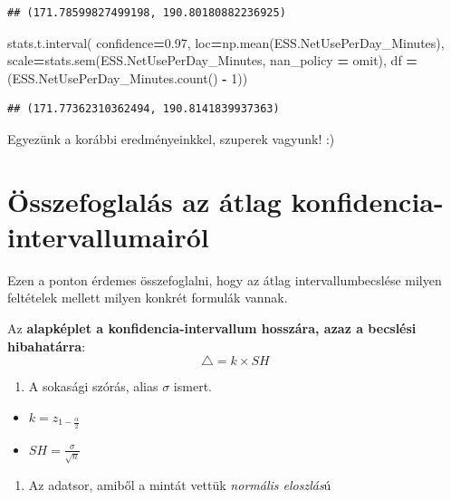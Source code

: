 \documentclass[
]{book}
\newenvironment{Shaded}{\begin{snugshade}}{\end{snugshade}}
\newcommand{\DecValTok}[1]{\textcolor[rgb]{0.00,0.00,0.81}{#1}}
\newcommand{\FloatTok}[1]{\textcolor[rgb]{0.00,0.00,0.81}{#1}}
\newcommand{\NormalTok}[1]{#1}
\newcommand{\OperatorTok}[1]{\textcolor[rgb]{0.81,0.36,0.00}{\textbf{#1}}}
\newcommand{\StringTok}[1]{\textcolor[rgb]{0.31,0.60,0.02}{#1}}
\providecommand{\tightlist}{%
  \setlength{\itemsep}{0pt}\setlength{\parskip}{0pt}}
\begin{document}
\begin{verbatim}
## (171.78599827499198, 190.80180882236925)
\end{verbatim}

\begin{Shaded}
\begin{Highlighting}[]
  
\NormalTok{stats.t.interval(}
\NormalTok{  confidence}\OperatorTok{=}\FloatTok{0.97}\NormalTok{,}
\NormalTok{  loc}\OperatorTok{=}\NormalTok{np.mean(ESS.NetUsePerDay\_Minutes),}
\NormalTok{  scale}\OperatorTok{=}\NormalTok{stats.sem(ESS.NetUsePerDay\_Minutes, nan\_policy }\OperatorTok{=} \StringTok{\textquotesingle{}omit\textquotesingle{}}\NormalTok{),}
\NormalTok{  df }\OperatorTok{=}\NormalTok{ (ESS.NetUsePerDay\_Minutes.count() }\OperatorTok{{-}} \DecValTok{1}\NormalTok{))}
\end{Highlighting}
\end{Shaded}

\begin{verbatim}
## (171.77362310362494, 190.8141839937363)
\end{verbatim}

Egyezünk a korábbi eredményeinkkel, szuperek vagyunk! :)

\section{Összefoglalás az átlag konfidencia-intervallumairól}\label{uxf6sszefoglaluxe1s-az-uxe1tlag-konfidencia-intervallumairuxf3l}

Ezen a ponton érdemes összefoglalni, hogy az átlag intervallumbecslése milyen feltételek mellett milyen konkrét formulák vannak.

Az \textbf{alapképlet a konfidencia-intervallum hosszára, azaz a becslési hibahatárra}: \[\triangle = k \times SH\]

\begin{enumerate}
\def\labelenumi{\arabic{enumi}.}
\tightlist
\item
  A sokasági szórás, alias \(\sigma\) ismert.
\end{enumerate}

\begin{itemize}
\tightlist
\item
  \(k=z_{1-\frac{\alpha}{2}}\)
\item
  \(SH=\frac{\sigma}{\sqrt{n}}\)
\end{itemize}

\begin{enumerate}
\def\labelenumi{\arabic{enumi}.}
\setcounter{enumi}{1}
\tightlist
\item
  Az adatsor, amiből a mintát vettük \emph{normális eloszlás}ú
\end{enumerate}
\end{document}
